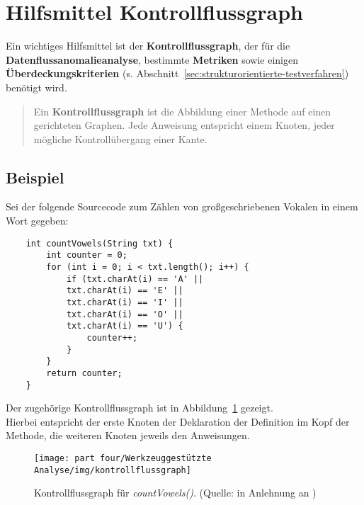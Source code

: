 \section{Hilfsmittel Kontrollflussgraph}\label{sec:hilfsmittel-kontrollflussgraph}
Ein wichtiges Hilfsmittel ist der \textbf{Kontrollflussgraph}, der für die \textbf{Datenflussanomalieanalyse}, bestimmte \textbf{Metriken} sowie einigen \textbf{Überdeckungskriterien} (s. Abschnitt~\ref{sec:strukturorientierte-testverfahren}) benötigt wird.

\begin{tcolorbox}[title=Kontrollflussgraph]
    \blockquote[{\cite[32, Hervorhebung eigene]{Wed09c}}]{
        Ein \textbf{Kontrollflussgraph} ist die Abbildung einer Methode auf einen gerichteten Graphen.
        Jede Anweisung entspricht einem Knoten, jeder mögliche Kontrollübergang einer Kante.
    }
\end{tcolorbox}

\subsection*{Beispiel}

Sei der folgende Sourcecode zum Zählen von großgeschriebenen Vokalen in einem Wort gegeben:

\begin{verbatim}
    int countVowels(String txt) {
        int counter = 0;
        for (int i = 0; i < txt.length(); i++) {
            if (txt.charAt(i) == 'A' ||
            txt.charAt(i) == 'E' ||
            txt.charAt(i) == 'I' ||
            txt.charAt(i) == 'O' ||
            txt.charAt(i) == 'U') {
                counter++;
            }
        }
        return counter;
    }
\end{verbatim}

\noindent
Der zugehörige Kontrollflussgraph ist in Abbildung~\ref{fig:kontrollflussgraph} gezeigt.\\
Hierbei entspricht der erste Knoten der Deklaration der Definition im Kopf der Methode, die weiteren Knoten jeweils den Anweisungen.



\begin{figure}
    \centering
    \texttt{[image: part four/Werkzeuggestützte Analyse/img/kontrollflussgraph]}
    \caption{Kontrollflussgraph für \textit{countVowels()}. (Quelle: in Anlehnung an \cite[Abb. 4.1, 32]{Wed09c})}
    \label{fig:kontrollflussgraph}
\end{figure}
